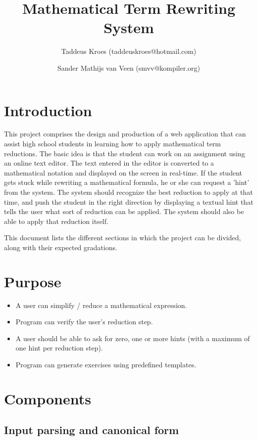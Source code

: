 \documentclass[10pt,a4paper]{article}
\title{Mathematical Term Rewriting System}
\author{Taddeus Kroes (taddeuskroes@hotmail.com)
    \and Sander Mathijs van Veen (smvv@kompiler.org)}
\begin{document}
\maketitle

\section{Introduction}

This project comprises the design and production of a web application that can
assist high school students in learning how to apply mathematical term
reductions. The basic idea is that the student can work on an assignment using
an online text editor. The text entered in the editor is converted to a
mathematical notation and displayed on the screen in real-time. If the student
gets stuck while rewriting a mathematical formula, he or she can request a
'hint' from the system. The system should recognize the best reduction to
apply at that time, and push the student in the right direction by displaying
a textual hint that tells the user what sort of reduction can be applied. The
system should also be able to apply that reduction itself.

This document lists the different sections in which the project can be
divided, along with their expected gradations.

\section{Purpose}

\begin{itemize}
    \item A user can simplify / reduce a mathematical expression.
    \item Program can verify the user's reduction step.
    \item A user should be able to ask for zero, one or more hints (with a
    maximum of one hint per reduction step).
    \item Program can generate exercises using predefined templates.
\end{itemize}

\section{Components}

\subsection{Input parsing and canonical form}
\end{document}
